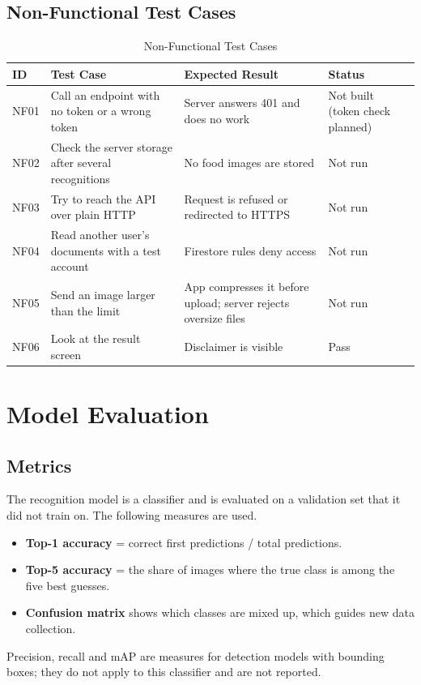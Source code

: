 \subsection{Non-Functional Test Cases}
\begin{table}[H]
\centering
\caption{Non-Functional Test Cases}
\label{tab:nf}
\small
\begin{tabularx}{\textwidth}{|l|>{\raggedright\arraybackslash}p{4.3cm}|>{\raggedright\arraybackslash}X|>{\raggedright\arraybackslash}p{2.6cm}|}
\hline
\textbf{ID} & \textbf{Test Case} & \textbf{Expected Result} & \textbf{Status} \\ \hline
NF01 & Call an endpoint with no token or a wrong token & Server answers 401 and does no work & Not built (token check planned) \\ \hline
NF02 & Check the server storage after several recognitions & No food images are stored & Not run \\ \hline
NF03 & Try to reach the API over plain HTTP & Request is refused or redirected to HTTPS & Not run \\ \hline
NF04 & Read another user's documents with a test account & Firestore rules deny access & Not run \\ \hline
NF05 & Send an image larger than the limit & App compresses it before upload; server rejects oversize files & Not run \\ \hline
NF06 & Look at the result screen & Disclaimer is visible & Pass \\ \hline
\end{tabularx}
\end{table}

\section{Model Evaluation}\label{sec:modeleval}
\subsection{Metrics}
The recognition model is a classifier and is evaluated on a validation set that it did not train on. The
following measures are used.
\begin{itemize}[noitemsep]
  \item \textbf{Top-1 accuracy} = correct first predictions / total predictions.
  \item \textbf{Top-5 accuracy} = the share of images where the true class is among the five best guesses.
  \item \textbf{Confusion matrix} shows which classes are mixed up, which guides new data collection.
\end{itemize}
Precision, recall and mAP are measures for detection models with bounding boxes; they do not apply to this
classifier and are not reported.

